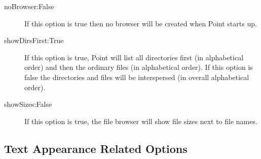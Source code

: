 \begin{description}
\item[noBrowser:False]
If this option is true then no browser will be created when Point
starts up.

\item[showDirsFirst:True]
If this option is true, Point will list all directories first
(in alphabetical order) and then the ordinary files
(in alphabetical order).
If this option is false the directories and files will
be interspersed (in overall alphabetical order).

\item[showSizes:False]
If this option is true, the file browser will show file sizes
next to file names.

\end{description}



\subsection{Text Appearance Related Options}

